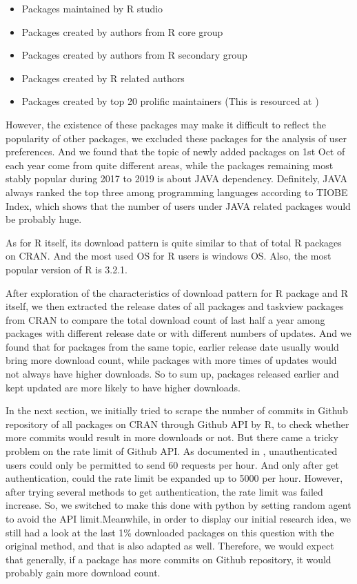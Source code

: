 \documentclass[
]{book}
\providecommand{\tightlist}{%
  \setlength{\itemsep}{0pt}\setlength{\parskip}{0pt}}
\begin{document}
\begin{itemize}
\tightlist
\item
  Packages maintained by R studio
\item
  Packages created by authors from R core group
\item
  Packages created by authors from R secondary group
\item
  Packages created by R related authors
\item
  Packages created by top 20 prolific maintainers (This is resourced at \citet{revolutions})
\end{itemize}

However, the existence of these packages may make it difficult to reflect the popularity of other packages, we excluded these packages for the analysis of user preferences. And we found that the topic of newly added packages on 1st Oct of each year come from quite different areas, while the packages remaining most stably popular during 2017 to 2019 is about JAVA dependency. Definitely, JAVA always ranked the top three among programming languages according to TIOBE Index\citep{tiobe}, which shows that the number of users under JAVA related packages would be probably huge.

As for R itself, its download pattern is quite similar to that of total R packages on CRAN. And the most used OS for R users is windows OS. Also, the most popular version of R is 3.2.1.

After exploration of the characteristics of download pattern for R package and R itself, we then extracted the release dates of all packages and taskview packages from CRAN to compare the total download count of last half a year among packages with different release date or with different numbers of updates. And we found that for packages from the same topic, earlier release date usually would bring more download count, while packages with more times of updates would not always have higher downloads. So to sum up, packages released earlier and kept updated are more likely to have higher downloads.

In the next section, we initially tried to scrape the number of commits in Github repository of all packages on CRAN through Github API by R, to check whether more commits would result in more downloads or not. But there came a tricky problem on the rate limit of Github API. As documented in \citet{githubapi}, unauthenticated users could only be permitted to send 60 requests per hour. And only after get authentication, could the rate limit be expanded up to 5000 per hour. However, after trying several methods to get authentication, the rate limit was failed increase. So, we switched to make this done with python by setting random agent to avoid the API limit.Meanwhile, in order to display our initial research idea, we still had a look at the last 1\% downloaded packages on this question with the original method, and that is also adapted as well. Therefore, we would expect that generally, if a package has more commits on Github repository, it would probably gain more download count.
\end{document}
